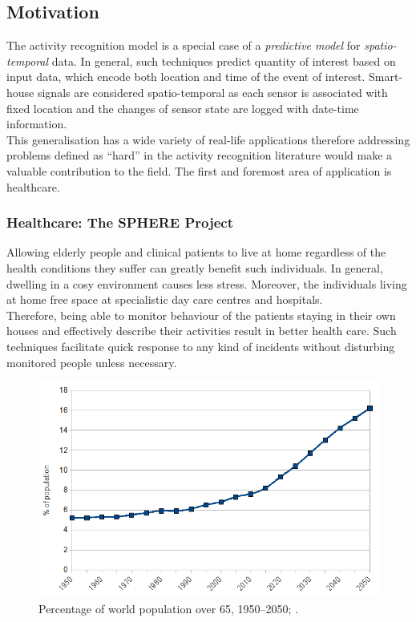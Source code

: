 \documentclass[10pt, a4paper, pdflatex, leqno, twoside, openright]{report}
\begin{document}
    \subsection{Motivation\label{sec:applications}} %
The activity recognition model is a special case of a \emph{predictive model} for \emph{spatio-temporal} data. In general, such techniques predict quantity of interest based on input data, which encode both location and time of the event of interest. Smart-house signals are considered spatio-temporal as each sensor is associated with fixed location and the changes of sensor state are logged with date-time information.\\
This generalisation has a wide variety of real-life applications therefore addressing problems defined as ``hard'' in the activity recognition literature would make a valuable contribution to the field. 
The first and foremost area of application is healthcare.

      \subsubsection{Healthcare: The SPHERE Project}
Allowing elderly people and clinical patients to live at home regardless of the health conditions they suffer can greatly benefit such individuals. In general, dwelling in a cosy environment causes less stress. Moreover, the individuals living at home free space at specialistic day care centres and hospitals.\\
Therefore, being able to monitor behaviour of the patients staying in their own houses and effectively describe their activities result in better health care. Such techniques facilitate quick response to any kind of incidents without disturbing monitored people unless necessary.\\

\begin{figure}
  \centering
  \includegraphics[scale=.5]{./gfx/populationOver65}
  \caption{Percentage of world population over 65, 1950--2050; \citep{populationAgeing}.\label{fig:agingPopulatiom}}
\end{figure}
\end{document}
